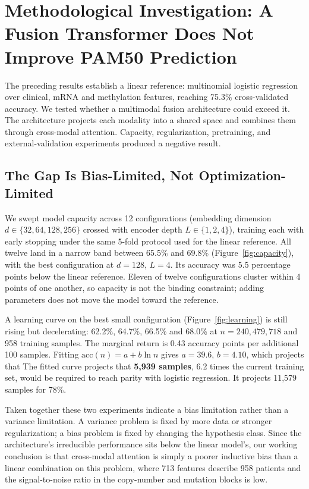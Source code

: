 \documentclass[11pt,a4paper]{article}
\begin{document}
\section{Methodological Investigation: A Fusion Transformer Does Not Improve PAM50 Prediction}
\label{sec:route_a}

The preceding results establish a linear reference: multinomial logistic regression over
clinical, mRNA and methylation features, reaching 75.3\% cross-validated accuracy. We tested
whether a multimodal fusion architecture could exceed it. The architecture projects each
modality into a shared space and combines them through cross-modal attention. Capacity,
regularization, pretraining, and external-validation experiments produced a negative result.

\subsection{The Gap Is Bias-Limited, Not Optimization-Limited}
\label{sec:route_a_bias}

We swept model capacity across 12 configurations (embedding dimension $d \in \{32,64,128,256\}$
crossed with encoder depth $L \in \{1,2,4\}$), training each with early stopping under the same
5-fold protocol used for the linear reference. All twelve land in a narrow band between 65.5\%
and 69.8\% (Figure~\ref{fig:capacity}), with the best configuration at $d{=}128$, $L{=}4$.
Its accuracy was 5.5 percentage points below the linear reference. Eleven of
twelve configurations cluster within 4 points of one another, so capacity is not the binding
constraint; adding parameters does not move the model toward the reference.

A learning curve on the best small configuration (Figure~\ref{fig:learning}) is still rising but
decelerating: 62.2\%, 64.7\%, 66.5\% and 68.0\% at $n = 240, 479, 718$ and 958 training samples.
The marginal return is 0.43 accuracy points per additional 100 samples. Fitting
$\mathrm{acc}(n) = a + b\ln n$ gives $a = 39.6$, $b = 4.10$, which projects that
The fitted curve projects that \textbf{5{,}939 samples}, 6.2 times the current training set,
would be required to reach parity with logistic regression. It projects 11{,}579 samples for 78\%.

Taken together these two experiments indicate a bias limitation rather than a variance
limitation. A variance problem is fixed by more data or stronger regularization; a bias problem
is fixed by changing the hypothesis class. Since the architecture's irreducible performance sits
below the linear model's, our working conclusion is that cross-modal attention is simply a
poorer inductive bias than a linear combination on this problem, where 713 features describe
958 patients and the signal-to-noise ratio in the copy-number and mutation blocks is low.
\end{document}

